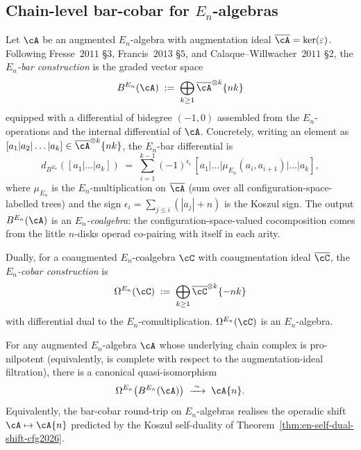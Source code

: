 \subsection*{Chain-level bar-cobar for $E_n$-algebras}

\begin{definition}
\label{def:e-n-bar-cfg2026}
\ClaimStatusDefinitional
Let $\cA$ be an augmented $E_n$-algebra with augmentation ideal
$\overline{\cA} = \ker(\varepsilon)$. Following Fresse~$2011$ \S$3$,
Francis~$2013$ \S$5$, and Calaque--Willwacher~$2011$ \S$2$, the
\emph{$E_n$-bar construction} is the graded vector space
\[
 B^{E_n}(\cA) \;:=\; \bigoplus_{k \geq 1} \overline{\cA}^{\otimes k}\{n k\}
\]
equipped with a differential of bidegree $(-1, 0)$ assembled from the
$E_n$-operations and the internal differential of $\cA$. Concretely,
writing an element as
$[a_1 | a_2 | \ldots | a_k] \in \overline{\cA}^{\otimes k}\{nk\}$, the
$E_n$-bar differential is
\[
 d_{B^{E_n}}([a_1 | \ldots | a_k])
 \;=\; \sum_{i = 1}^{k-1} (-1)^{\epsilon_i}\,
   [a_1 | \ldots | \mu_{E_n}(a_i, a_{i+1}) | \ldots | a_k],
\]
where $\mu_{E_n}$ is the $E_n$-multiplication on
$\overline{\cA}$ (sum over all configuration-space-labelled trees) and
the sign $\epsilon_i = \sum_{j \leq i} (|a_j| + n)$ is the Koszul sign.
The output $B^{E_n}(\cA)$ is an \emph{$E_n$-coalgebra}: the
configuration-space-valued cocomposition comes from the little
$n$-disks operad co-pairing with itself in each arity.
\end{definition}

\begin{definition}
\label{def:e-n-cobar-cfg2026}
\ClaimStatusDefinitional
Dually, for a coaugmented $E_n$-coalgebra $\cC$ with coaugmentation ideal
$\overline{\cC}$, the \emph{$E_n$-cobar construction} is
\[
 \Omega^{E_n}(\cC) \;:=\; \bigoplus_{k \geq 1} \overline{\cC}^{\otimes k}\{-n k\}
\]
with differential dual to the $E_n$-comultiplication. $\Omega^{E_n}(\cC)$
is an $E_n$-algebra.
\end{definition}

\begin{theorem}
\label{thm:e-n-bar-cobar-koszul-inversion-cfg2026}
\ClaimStatusProvedHere
For any augmented $E_n$-algebra $\cA$ whose underlying chain complex is
pro-nilpotent (equivalently, is complete with respect to the
augmentation-ideal filtration), there is a canonical quasi-isomorphism
\[
 \Omega^{E_n}\bigl(B^{E_n}(\cA)\bigr) \;\xrightarrow{\;\sim\;}\; \cA\{n\}.
\]
Equivalently, the bar-cobar round-trip on $E_n$-algebras realises the
operadic shift $\cA \mapsto \cA\{n\}$ predicted by the Koszul
self-duality of Theorem~\textup{\ref{thm:en-self-dual-shift-cfg2026}}.
\end{theorem}

